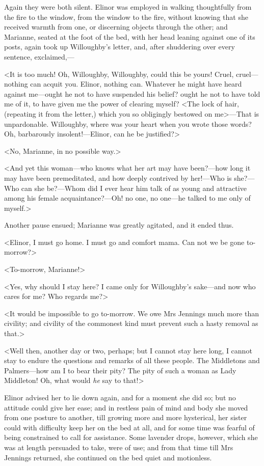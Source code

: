 Again they were both silent. Elinor was employed in walking thoughtfully from the fire to the window, from the window to the fire, without knowing that she received warmth from one, or discerning objects through the other; and Marianne, seated at the foot of the bed, with her head leaning against one of its posts, again took up Willoughby's letter, and, after shuddering over every sentence, exclaimed,—

<It is too much! Oh, Willoughby, Willoughby, could this be yours! Cruel, cruel—nothing can acquit you. Elinor, nothing can. Whatever he might have heard against me—ought he not to have suspended his belief? ought he not to have told me of it, to have given me the power of clearing myself? <The lock of hair, (repeating it from the letter,) which you so obligingly bestowed on me>—That is unpardonable. Willoughby, where was your heart when you wrote those words? Oh, barbarously insolent!—Elinor, can he be justified?>

<No, Marianne, in no possible way.>

<And yet this woman—who knows what her art may have been?—how long it may have been premeditated, and how deeply contrived by her!—Who is she?—Who can she be?—Whom did I ever hear him talk of as young and attractive among his female acquaintance?—Oh! no one, no one—he talked to me only of myself.>

Another pause ensued; Marianne was greatly agitated, and it ended thus.

<Elinor, I must go home. I must go and comfort mama. Can not we be gone to-morrow?>

<To-morrow, Marianne!>

<Yes, why should I stay here? I came only for Willoughby's sake—and now who cares for me? Who regards me?>

<It would be impossible to go to-morrow. We owe Mrs Jennings much more than civility; and civility of the commonest kind must prevent such a hasty removal as that.>

<Well then, another day or two, perhaps; but I cannot stay here long, I cannot stay to endure the questions and remarks of all these people. The Middletons and Palmers—how am I to bear their pity? The pity of such a woman as Lady Middleton! Oh, what would \textit{he} say to that!>

Elinor advised her to lie down again, and for a moment she did so; but no attitude could give her ease; and in restless pain of mind and body she moved from one posture to another, till growing more and more hysterical, her sister could with difficulty keep her on the bed at all, and for some time was fearful of being constrained to call for assistance. Some lavender drops, however, which she was at length persuaded to take, were of use; and from that time till Mrs Jennings returned, she continued on the bed quiet and motionless.